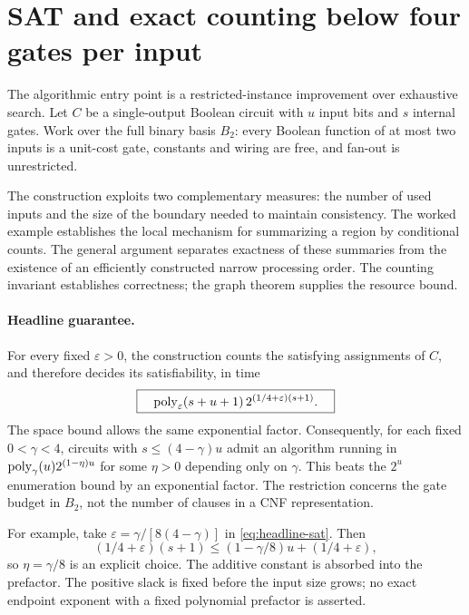 \section{SAT and exact counting below four gates per input}
\label{sec:algorithm-overview}

The algorithmic entry point is a restricted-instance improvement over
exhaustive search. Let $C$ be a single-output Boolean circuit with $u$
input bits and $s$ internal gates. Work over the full binary basis $B_2$:
every Boolean function of at most two inputs is a unit-cost gate,
constants and wiring are free, and fan-out is unrestricted.

The construction exploits two complementary measures: the number of
used inputs and the size of the boundary needed to maintain consistency.
The worked example establishes the local mechanism for summarizing a
region by conditional counts. The general argument separates exactness
of these summaries from the existence of an efficiently constructed
narrow processing order. The counting invariant establishes correctness;
the graph theorem supplies the resource bound.

\paragraph{Headline guarantee.}
For every fixed $\varepsilon>0$, the construction counts the satisfying
assignments of $C$, and therefore decides its satisfiability, in time
\begin{equation}\label{eq:headline-sat}
 \boxed{\quad
 \operatorname{poly}_\varepsilon(s+u+1)\,
 2^{(1/4+\varepsilon)(s+1)}.
 \quad}
\end{equation}
The space bound allows the same exponential factor. Consequently, for
each fixed $0<\gamma<4$, circuits with $s\le(4-\gamma)u$ admit an
algorithm running in $\operatorname{poly}_\gamma(u)2^{(1-\eta)u}$ for some
$\eta>0$ depending only on $\gamma$. This beats the $2^u$ enumeration
bound by an exponential factor. The restriction concerns the gate
budget in $B_2$, not the number of clauses in a CNF representation.

For example, take $\varepsilon=\gamma/[8(4-\gamma)]$ in
\eqref{eq:headline-sat}. Then
\[
 (1/4+\varepsilon)(s+1)
 \le (1-\gamma/8)u+(1/4+\varepsilon),
\]
so $\eta=\gamma/8$ is an explicit choice. The additive constant is
absorbed into the prefactor. The positive slack is fixed before the
input size grows; no exact endpoint exponent with a fixed polynomial
prefactor is asserted.

